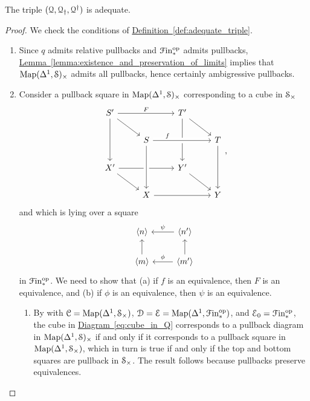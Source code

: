 \documentclass[main.tex]{subfiles}
\begin{document}
\begin{lemma}
  The triple $\triple{Q}$ is adequate.
\end{lemma}
\begin{proof}
  We check the conditions of \hyperref[def:adequate_triple]{Definition~\ref*{def:adequate_triple}}.
  \begin{enumerate}
    \item Since $q$ admits relative pullbacks and $\Finp\op$ admits pullbacks, \hyperref[lemma:existence_and_preservation_of_limits]{Lemma~\ref*{lemma:existence_and_preservation_of_limits}} implies that $\Map(\Delta^{1}, \S)_{\times}$ admits all pullbacks, hence certainly ambigressive pullbacks.

    \item Consider a pullback square in $\Map(\Delta^{1}, \S)_{\times}$ corresponding to a cube in $\S_{\times}$
      \begin{equation}
        \label{eq:cube_in_Q}
        \begin{tikzcd}
          S'
          \arrow[rr, "F"]
          \arrow[dd]
          \arrow[dr]
          && T'
          \arrow[dd]
          \arrow[dr]
          \\
          & S
          \arrow[rr, crossing over, near start, "f"]
          && T
          \arrow[dd]
          \\
          X'
          \arrow[dr]
          \arrow[rr]
          && Y'
          \arrow[dr]
          \\
          & X
          \arrow[from=uu, crossing over]
          \arrow[rr]
          && Y
        \end{tikzcd},
      \end{equation}
      and which is lying over a square
      \begin{equation}
        \label{eq:square_in_finp_under_Q}
        \begin{tikzcd}
          \langle n \rangle
          & \langle n' \rangle
          \arrow[l, swap, "\psi"]
          \\
          \langle m \rangle
          \arrow[u]
          & \langle m' \rangle
          \arrow[l, swap, "\phi"]
          \arrow[u]
        \end{tikzcd}
      \end{equation}
      in $\Finp\op$. We need to show that (a) if $f$ is an equivalence, then $F$ is an equivalence, and (b) if $\phi$ is an equivalence, then $\psi$ is an equivalence.
      \begin{enumerate}
        \item By \cite[Cor.\ 4.3.1.15]{highertopostheory} with $\category{C} = \Map(\Delta^{1}, \S_{\times})$, $\category{D} = \category{E} = \Map(\Delta^{1}, \Finp\op)$, and $\category{E}_{0} = \Finp\op$, the cube in \hyperref[eq:cube_in_Q]{Diagram~\ref*{eq:cube_in_Q}} corresponds to a pullback diagram in $\Map(\Delta^{1}, \S)_{\times}$ if and only if it corresponds to a pullback square in $\Map(\Delta^{1}, \S_{\times})$, which in turn is true if and only if the top and bottom squares are pullback in $\S_{\times}$. The result follows because pullbacks preserve equivalences.


\end{enumerate}
\end{enumerate}
\end{proof}
\end{document}
